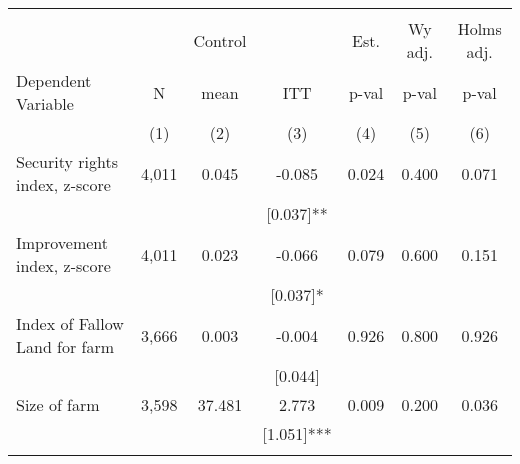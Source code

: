 \begin{tabular}{lcccccc}
\hline \noalign{\smallskip} &  &  &  &  &  & \\
 &  & Control &  & Est. & Wy adj. & Holms adj.\\
Dependent Variable & N & mean & ITT & p-val & p-val & p-val\\
 & (1) & (2) & (3) & (4) & (5) & (6)\\
\noalign{\smallskip}\hline \noalign{\smallskip}Security rights index, z-score & 4,011 & 0.045 & -0.085 & 0.024 & 0.400 & 0.071\\
 &  &  & [0.037]** &  &  & \\
Improvement index, z-score & 4,011 & 0.023 & -0.066 & 0.079 & 0.600 & 0.151\\
 &  &  & [0.037]* &  &  & \\
Index of Fallow Land for farm & 3,666 & 0.003 & -0.004 & 0.926 & 0.800 & 0.926\\
 &  &  & [0.044] &  &  & \\
Size of farm & 3,598 & 37.481 & 2.773 & 0.009 & 0.200 & 0.036\\
 &  &  & [1.051]*** &  &  & \\
\noalign{\smallskip}\hline\end{tabular}
